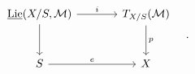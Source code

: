 \[
\begin{tikzcd}[column sep=large,row sep=large]
\underline{\operatorname{Lie}}(X/S,\mathcal M) \arrow[r,"i"] \arrow[d] & T_{X/S}(\mathcal M) \arrow[d,"p"]\\
S \arrow[r,"e"] & X
\end{tikzcd}\quad .
\]
